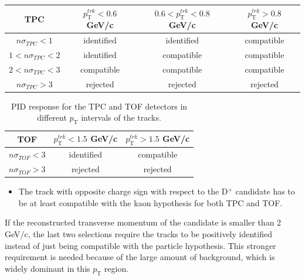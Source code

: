 \documentclass[b5paper,10pt,twoside,oldstyle,classica]{toptesi}
\newcommand{\pt}{p_\text{T}}
\begin{document}
\begin{table}[hb]
\centering 
\begin{center} %
\renewcommand\arraystretch{1.2} 
\fontsize{9.}{11}\selectfont
\begin{tabular}{|c|c|c|c|}
\hline
TPC & $\pt^{trk} < 0.6$ GeV/c & $0.6 < \pt^{trk} < 0.8$ GeV/c &  $\pt^{trk} > 0.8$ GeV/c\\
\hline
$n\sigma_{TPC} < 1$ & identified & identified &compatible \\
$1 < n\sigma_{TPC} < 2$ & identified & compatible &  compatible \\
$2 < n\sigma_{TPC} < 3$ & compatible & compatible &  compatible\\
$n\sigma_{TPC} > 3$ & rejected & rejected & rejected \\
\hline
\end{tabular}
\end{center} 
\end{table}
\vspace{-0.6cm}
\begin{table}[h]
\centering 
\begin{center} %
\renewcommand\arraystretch{1.2} 
\fontsize{9.}{11}\selectfont
\begin{tabular}{|c|c|c|}
\hline
TOF & $\pt^{trk} < 1.5$ GeV/c & $\pt^{trk} > 1.5$ GeV/c\\
\hline
$n\sigma_{TOF} < 3$ & identified & compatible \\
$n\sigma_{TOF} > 3$ & rejected & rejected \\
\hline
\end{tabular}
\caption{PID response for the TPC and TOF detectors in different $\pt$ intervals of the tracks.}
\label{PIDresponse}
\end{center} 
\end{table} 
\begin{itemize}
 \item The track with opposite charge sign with respect to the D$^+$ candidate has to be at least compatible with the kaon hypothesis for both TPC and TOF.
\end{itemize} 
If the reconstructed transverse momentum of the candidate is smaller than 2 GeV/c, the last two selections require the tracks to be positively identified instead of just being compatible with the particle hypothesis. This stronger requirement is needed because of the large amount of background, which is widely dominant in this $\pt$ region.  
\end{document}
